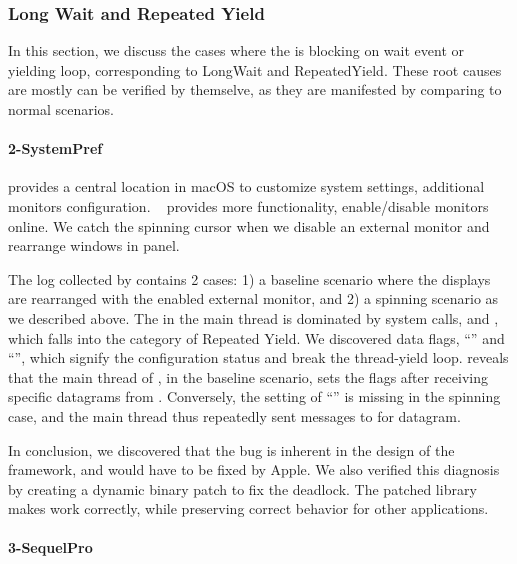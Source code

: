 \subsubsection{Long Wait and Repeated Yield}

In this section, we discuss the cases where the \spinningnode is blocking on
wait event or yielding loop, corresponding to LongWait and RepeatedYield.
These root causes are mostly can be verified by themselve, as they are
manifested by comparing to normal scenarios.

\paragraph{2-SystemPref}

 provides a central location in macOS to
customize system settings, \eg additional monitors configuration.
~\cite{disablemonitor} provides more functionality,
enable/disable monitors online. We catch the spinning cursor when we disable
an external monitor and rearrange windows in  panel.

The log collected by \xxx contains 2 cases: 1) a baseline scenario where
the displays are rearranged with the enabled external monitor, and 2) a
spinning scenario as we described above. The \spinningnode in the main
thread is dominated by system calls,  and ,
which falls into the category of Repeated Yield. We discovered data flags,
``'' and ``'', which
signify the configuration status and break the thread-yield loop. \xxx reveals
that the main thread of , in the baseline scenario, sets
the flags after receiving specific datagrams from . Conversely,
the setting of ``'' is missing in the spinning case,
and the main thread thus repeatedly sent messages to  for
datagram.

In conclusion, we discovered that the bug is inherent in the design of the
 framework, and would have to be fixed by Apple. We also
verified this diagnosis by creating a dynamic binary patch to fix the deadlock.
The patched library makes  work correctly, while preserving
correct behavior for other applications.

\paragraph{3-SequelPro}

